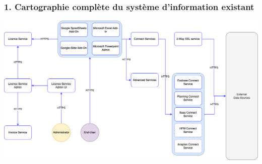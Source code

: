 \documentclass[aspectratio=169]{beamer}
\begin{document}
\begin{frame}
  \frametitle{1. Cartographie complète du système d’information existant}
  \includegraphics[height=0.65\textheight, center]{Imgs/schema-qibates-original.png}
\end{frame}
\end{document}
